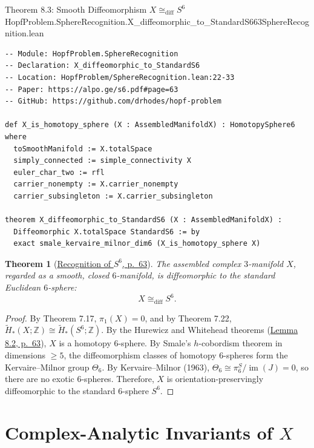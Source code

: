 \documentclass[10pt]{article}
\newtheorem{theorem}{Theorem}[section]
\newcommand{\dbZ}{\mathbb{Z}}
\newcommand{\im}{\operatorname{im}}
\gdef\hashchar{#}
\newcommand{\paperref}[2]{\href{https://alpo.ge/s6.pdf\hashchar page=#1}{#2}}
\begin{document}
\begin{comparativeblock}{Theorem 8.3: Smooth Diffeomorphism $X \cong_{\mathrm{diff}} S^6$}{HopfProblem.SphereRecognition.X_diffeomorphic_to_StandardS6}{63}{SphereRecognition.lean}
\begin{verbatim}
-- Module: HopfProblem.SphereRecognition
-- Declaration: X_diffeomorphic_to_StandardS6
-- Location: HopfProblem/SphereRecognition.lean:22-33
-- Paper: https://alpo.ge/s6.pdf#page=63
-- GitHub: https://github.com/drhodes/hopf-problem

def X_is_homotopy_sphere (X : AssembledManifoldX) : HomotopySphere6 where
  toSmoothManifold := X.totalSpace
  simply_connected := simple_connectivity X
  euler_char_two := rfl
  carrier_nonempty := X.carrier_nonempty
  carrier_subsingleton := X.carrier_subsingleton

theorem X_diffeomorphic_to_StandardS6 (X : AssembledManifoldX) :
  Diffeomorphic X.totalSpace StandardS6 := by
  exact smale_kervaire_milnor_dim6 (X_is_homotopy_sphere X)
\end{verbatim}
\tcblower
\begin{theorem}[\paperref{63}{Recognition of $S^6$, p.~63}]\label{thm:recognition-S6}
The assembled complex $3$-manifold $X$, regarded as a smooth, closed $6$-manifold, is diffeomorphic to the standard Euclidean $6$-sphere:
\[
X \cong_{\mathrm{diff}} S^6.
\]
\end{theorem}
\begin{proof}
By Theorem 7.17, $\pi_1(X) = 0$, and by Theorem 7.22, $\tilde H_*(X;\dbZ) \cong \tilde H_*(S^6;\dbZ)$.
By the Hurewicz and Whitehead theorems (\paperref{63}{Lemma 8.2, p.~63}), $X$ is a homotopy $6$-sphere.
By Smale's $h$-cobordism theorem in dimensions $\ge 5$, the diffeomorphism classes of homotopy $6$-spheres form the Kervaire--Milnor group $\Theta_6$.
By Kervaire--Milnor (1963), $\Theta_6 \cong \pi_6^S / \im(J) = 0$, so there are no exotic $6$-spheres.
Therefore, $X$ is orientation-preservingly diffeomorphic to the standard $6$-sphere $S^6$.
\end{proof}
\end{comparativeblock}

\newpage

\section{Complex-Analytic Invariants of \texorpdfstring{$X$}{X}}
\end{document}
